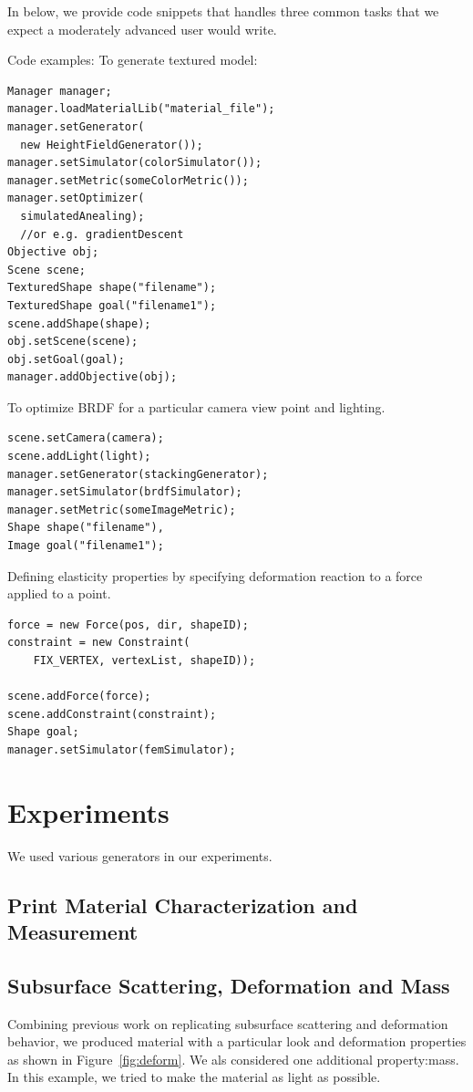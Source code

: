 \documentclass[annual]{acmsiggraph}
\begin{document}
In below, we provide code snippets that handles three common tasks
that we expect a moderately advanced user would write.

Code examples:
To generate textured model:
\begin{verbatim}
Manager manager;
manager.loadMaterialLib("material_file");
manager.setGenerator(
  new HeightFieldGenerator());
manager.setSimulator(colorSimulator());
manager.setMetric(someColorMetric());
manager.setOptimizer(
  simulatedAnealing);
  //or e.g. gradientDescent
Objective obj;
Scene scene;
TexturedShape shape("filename");
TexturedShape goal("filename1");
scene.addShape(shape);
obj.setScene(scene);
obj.setGoal(goal);
manager.addObjective(obj);
\end{verbatim}

To optimize BRDF for a particular camera view point and lighting.
\begin{verbatim}
scene.setCamera(camera);
scene.addLight(light);
manager.setGenerator(stackingGenerator);
manager.setSimulator(brdfSimulator);
manager.setMetric(someImageMetric);
Shape shape("filename"), 
Image goal("filename1");
\end{verbatim}

Defining elasticity properties
by specifying deformation 
reaction to a force applied to a point.

\begin{verbatim}
force = new Force(pos, dir, shapeID);
constraint = new Constraint(
    FIX_VERTEX, vertexList, shapeID));

scene.addForce(force);
scene.addConstraint(constraint);
Shape goal;
manager.setSimulator(femSimulator);
\end{verbatim}

\section{Experiments}
We used various generators in our experiments.
\subsection{Print Material Characterization and Measurement}
\subsection{Subsurface Scattering, Deformation and Mass}
Combining previous work on replicating
subsurface scattering and deformation behavior, 
we produced
material with a particular
look and deformation properties as shown in Figure~\ref{fig:deform}.
We als considered one additional property:mass. 
In this example, we
tried to make the material as light as possible.
\end{document}
